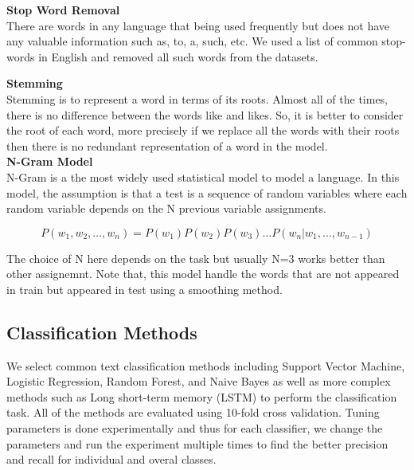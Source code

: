 \documentclass[letterpaper, 12pt]{article}
\begin{document}
\vspace*{10pt}
\textbf{Stop Word Removal}\\


There are words in any language that being used frequently but does not have any valuable information such as, to, a, such, etc. We used a list of common stop-words in English and removed all such words from the datasets.   



\vspace*{10pt}
\textbf{Stemming}\\

Stemming is to represent a word in terms of its roots. Almost all of the times,  there is no difference between the words like and likes. So, it is better to consider the root of each word, more precisely if we replace all the words with their roots then there is no redundant representation of a word in the model. \\

\vspace*{10pt}
\textbf{N-Gram Model}\\

N-Gram is a the most widely used statistical model to model a language. In this model, the assumption is that a test is a sequence of random variables where each random variable depends on the N previous variable assignments. 

\[
	P(w_1, w_2, \ldots, w_n) = P(w_1) P(w_2) P(w_3) \ldots P(w_n|w_1, \ldots, w_{n-1})
\]

The choice of N here depends on the task but usually N=3 works better than other assignemnt. Note that, this model handle the words that are not appeared in train but appeared in test using a smoothing method. \\



\vspace*{10pt}
\subsection{Classification Methods}
We select common text classification methods including Support Vector Machine, Logistic Regression,
Random Forest, and Naive Bayes as well as more complex methods such as Long short-term memory (LSTM) 
to perform the classification task. All of the methods are evaluated using 10-fold cross validation. 
Tuning parameters is done experimentally and thus for each classifier, we change the parameters 
and run the experiment multiple times to find the better precision and recall for individual and 
overal classes. 
\end{document}
